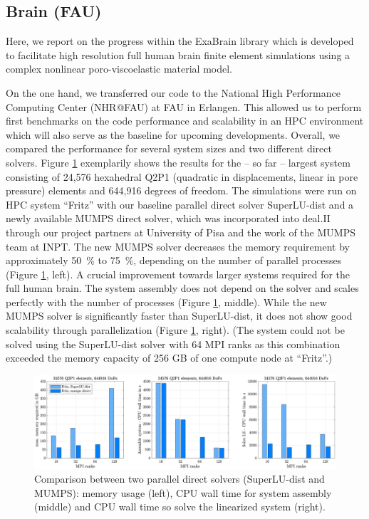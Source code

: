 \documentclass[a4paper,12pt]{article}
\begin{document}
\subsection{Brain (FAU)}

Here, we report on the progress within the ExaBrain library which is developed to facilitate high resolution full human brain finite element simulations using a complex nonlinear poro-viscoelastic material model.

On the one hand, we transferred our code to the National High Performance Computing Center (NHR@FAU) at FAU in Erlangen. This allowed us to perform first benchmarks on the code performance and scalability in an HPC environment which will also serve as the baseline for upcoming developments. Overall, we compared the performance for several system sizes and two different direct solvers. Figure \ref{fig:fau-solver-performance} exemplarily shows the results for the -- so far -- largest system consisting of 24,576 hexahedral Q2P1 (quadratic in displacements, linear in pore pressure) elements and 644,916 degrees of freedom. The simulations were run on HPC system ``Fritz'' with our baseline parallel direct solver SuperLU-dist and a newly available MUMPS direct solver, which was incorporated into deal.II through our project partners at University of Pisa and the work of the MUMPS team at INPT. The new MUMPS solver decreases the memory requirement by approximately \SI{50}{\percent} to \SI{75}{\percent}, depending on the number of parallel processes (Figure \ref{fig:fau-solver-performance}, left). A crucial improvement towards larger systems required for the full human brain. The system assembly does not depend on the solver and scales perfectly with the number of processes (Figure \ref{fig:fau-solver-performance}, middle). While the new MUMPS solver is significantly faster than SuperLU-dist, it does not show good scalability through parallelization (Figure \ref{fig:fau-solver-performance}, right). (The system could not be solved using the SuperLU-dist solver with 64 MPI ranks as this combination exceeded the memory capacity of 256 GB of one compute node at ``Fritz''.)

\begin{figure}
  \centering

  \includegraphics[width=\textwidth]{fau-solver-performance.jpg}

  \caption{Comparison between two parallel direct solvers (SuperLU-dist and MUMPS): memory usage (left), CPU wall time for system assembly (middle) and CPU wall time so solve the linearized system (right).}
  \label{fig:fau-solver-performance}
\end{figure}
\end{document}
